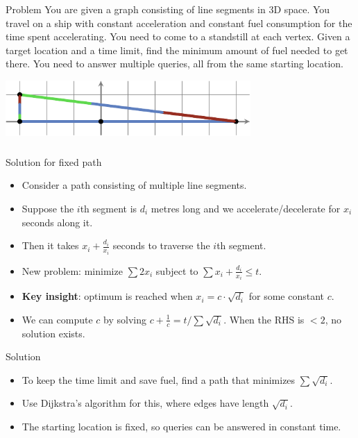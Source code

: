 \begin{frame}
  \frametitle{\problemtitle}
  \begin{block}{Problem}
    You are given a graph consisting of line segments in 3D space.
    You travel on a ship with constant acceleration and constant fuel consumption for the time spent accelerating.
    You need to come to a standstill at each vertex.
    Given a target location and a time limit, find the minimum amount of fuel needed to get there.
    You need to answer multiple queries, all from the same starting location.
  \end{block}
  \begin{center}
    \includegraphics[width=0.7\textwidth]{sample1}
  \end{center}
\end{frame}
\begin{frame}
  \frametitle{\problemtitle}
  \begin{block}{Solution for fixed path}
    \begin{itemize}
      \item Consider a path consisting of multiple line segments.
      \pause
      \item Suppose the $i$th segment is $d_i$ metres long and we accelerate/decelerate for $x_i$ seconds along it.
      \item Then it takes $x_i + \frac{d_i}{x_i}$ seconds to traverse the $i$th segment.
      \item New problem: minimize $\sum 2x_i$ subject to $\sum x_i + \frac{d_i}{x_i} \le t$.
      \item \textbf{Key insight}: optimum is reached when $x_i = c\cdot\sqrt{d_i}$ for some constant $c$.
      \item We can compute $c$ by solving $c + \frac{1}{c} = t / \sum\sqrt{d_i}$. When the RHS is $< 2$, no solution exists.
    \end{itemize}
  \end{block}
  \pause
  \begin{block}{Solution}
    \begin{itemize}
      \item<+-> To keep the time limit and save fuel, find a path that minimizes $\sum\sqrt{d_i}$.
      \item<+-> Use Dijkstra's algorithm for this, where edges have length $\sqrt{d_i}$.
      \item<+-> The starting location is fixed, so queries can be answered in constant time.
    \end{itemize}
  \end{block}
  \solvestats
\end{frame}
